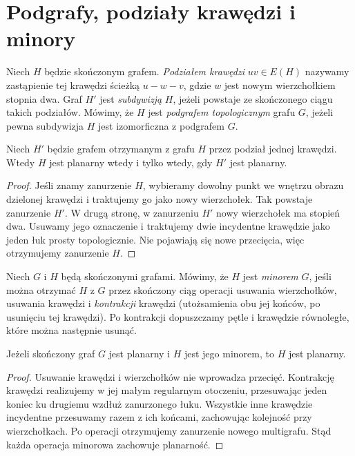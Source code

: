 \section{Podgrafy, podziały krawędzi i minory}
\label{sec:tg-rozne-redukcje}

\begin{definicja}
Niech $H$ będzie skończonym grafem. \emph{Podziałem krawędzi}
$uv\in E(H)$ nazywamy zastąpienie tej krawędzi ścieżką
$u-w-v$, gdzie $w$ jest nowym wierzchołkiem stopnia dwa.
Graf $H'$ jest \emph{subdywizją} $H$, jeżeli powstaje ze skończonego
ciągu takich podziałów. Mówimy, że $H$ jest \emph{podgrafem
topologicznym} grafu $G$, jeżeli pewna subdywizja $H$
jest izomorficzna z podgrafem $G$.
\end{definicja}

\begin{stwierdzenie}
Niech $H'$ będzie grafem otrzymanym z grafu $H$ przez podział
jednej krawędzi. Wtedy $H$ jest planarny wtedy i tylko wtedy,
gdy $H'$ jest planarny.
\end{stwierdzenie}

\begin{proof}
Jeśli znamy zanurzenie $H$, wybieramy dowolny punkt we wnętrzu
obrazu dzielonej krawędzi i traktujemy go jako nowy wierzchołek.
Tak powstaje zanurzenie $H'$.
W drugą stronę, w zanurzeniu $H'$ nowy wierzchołek ma stopień
dwa. Usuwamy jego oznaczenie i traktujemy dwie incydentne
krawędzie jako jeden łuk prosty topologicznie.
Nie pojawiają się nowe przecięcia, więc otrzymujemy zanurzenie $H$.
\end{proof}

\begin{definicja}
Niech $G$ i $H$ będą skończonymi grafami. Mówimy, że
$H$ jest \emph{minorem} $G$, jeśli można otrzymać $H$
z $G$ przez skończony ciąg operacji usuwania wierzchołków,
usuwania krawędzi i \emph{kontrakcji} krawędzi (utożsamienia
obu jej końców, po usunięciu tej krawędzi).
Po kontrakcji dopuszczamy pętle i krawędzie równoległe,
które można następnie usunąć.
\end{definicja}

\begin{stwierdzenie}
Jeżeli skończony graf $G$ jest planarny i $H$ jest jego minorem,
to $H$ jest planarny.
\end{stwierdzenie}

\begin{proof}
Usuwanie krawędzi i wierzchołków nie wprowadza przecięć.
Kontrakcję krawędzi realizujemy w jej małym regularnym
otoczeniu, przesuwając jeden koniec ku drugiemu wzdłuż
zanurzonego łuku. Wszystkie inne krawędzie incydentne
przesuwamy razem z ich końcami, zachowując kolejność
przy wierzchołkach. Po operacji otrzymujemy zanurzenie
nowego multigrafu. Stąd każda operacja minorowa zachowuje planarność.
\end{proof}

